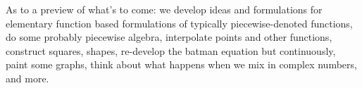 As to a preview of what's to come: we develop ideas and formulations for elementary function based formulations of typically piecewise-denoted functions, do some probably piecewise algebra, interpolate points and other functions, construct squares, shapes, re-develop the batman equation but continuously, paint some graphs, think about what happens when we mix in complex numbers, and more.


\newpage